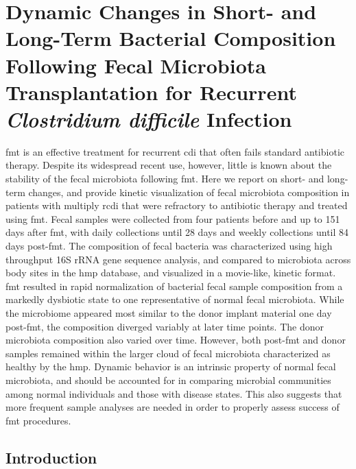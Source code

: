 \section{Dynamic Changes in Short- and Long-Term Bacterial Composition Following Fecal Microbiota Transplantation for Recurrent \textit{Clostridium difficile} Infection}\label{section_moviefmt}

\Gls{fmt} is an effective treatment for recurrent \gls{cdi} that often fails standard antibiotic therapy. Despite its widespread recent use, however, little is known about the stability of the fecal microbiota following \gls{fmt}. Here we report on short- and long-term changes, and provide kinetic visualization of fecal microbiota composition in patients with multiply \gls{rcdi} that were refractory to antibiotic therapy and treated using \gls{fmt}. Fecal samples were collected from four patients before and up to 151 days after \gls{fmt}, with daily collections until 28 days and weekly collections until 84 days post-\gls{fmt}. The composition of fecal bacteria was characterized using high throughput 16S rRNA gene sequence analysis, and compared to microbiota across body sites in the \gls{hmp} database, and visualized in a movie-like, kinetic format. \gls{fmt} resulted in rapid normalization of bacterial fecal sample composition from a markedly dysbiotic state to one representative of normal fecal microbiota.  While the microbiome appeared most similar to the donor implant material one day post-\gls{fmt}, the composition diverged variably at later time points. The donor microbiota composition also varied over time. However, both post-\gls{fmt} and donor samples remained within the larger cloud of fecal microbiota characterized as healthy by the \gls{hmp}. Dynamic behavior is an intrinsic property of normal fecal microbiota, and should be accounted for in comparing microbial communities among normal individuals and those with disease states.  This also suggests that more frequent sample analyses are needed in order to properly assess success of \gls{fmt} procedures.

\subsection{Introduction}

